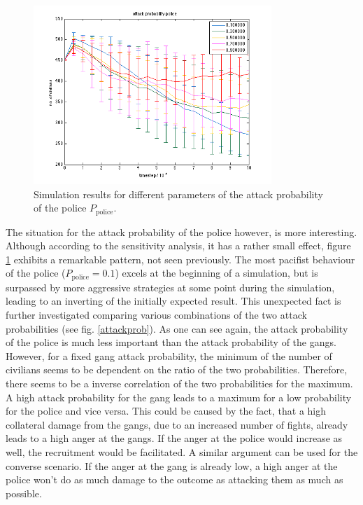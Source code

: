 \documentclass[11pt]{article}
\begin{document}
\begin{figure}[h!]
	\centering
	\includegraphics[width=9cm]{attackprobpolice.png}
   \caption{Simulation results for different parameters of the attack probability of the police $P_{\text{police}}$. }\label{attackprobpolice}
\end{figure}
The situation for the attack probability of the police however, is more interesting. 
Although according to the sensitivity analysis, it has a rather small effect, figure \ref{attackprobpolice} exhibits a remarkable pattern, not seen previously. The most pacifist behaviour of the police ($P_{\text{police}} = 0.1$) excels at the beginning of a simulation, but is surpassed by more aggressive strategies at some point during the simulation, leading to an inverting of the initially expected result.
This unexpected fact is further investigated comparing various combinations of the two attack probabilities (see fig. \ref{attackprob}).
As one can see again, the attack probability of the police is much less important than the attack probability of the gangs.
However, for a fixed gang attack probability, the minimum of the number of civilians seems to be dependent on the ratio of the two probabilities. Therefore, there seems to be a inverse correlation of the two probabilities for the maximum. A high attack probability for the gang leads to a maximum for a low probability for the police and vice versa. This could be caused by the fact, that a high collateral damage from the gangs, due to an increased number of fights, already leads to a high anger at the gangs. If the anger at the police would increase as well, the recruitment would be facilitated. A similar argument can be used for the converse scenario. If the anger at the gang is already low, a high anger at the police won't do as much damage to the outcome as attacking them as much as possible.
\end{document}
